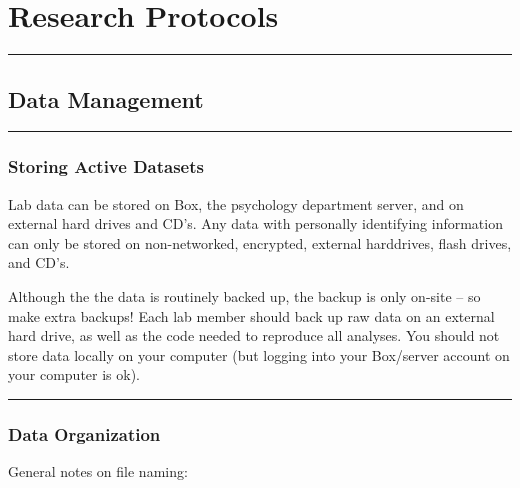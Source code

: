 \documentclass[
]{book}
\begin{document}
\hypertarget{research-protocols}{%
\chapter{Research Protocols}\label{research-protocols}}

\begin{center}\rule{0.5\linewidth}{0.5pt}\end{center}

\hypertarget{data-management}{%
\section{Data Management}\label{data-management}}

\begin{center}\rule{0.5\linewidth}{0.5pt}\end{center}

\hypertarget{storing-active-datasets}{%
\subsection{Storing Active Datasets}\label{storing-active-datasets}}

Lab data can be stored on Box, the psychology department server, and on external hard drives and CD's. Any data with personally identifying information can only be stored on non-networked, encrypted, external harddrives, flash drives, and CD's.

Although the the data is routinely backed up, the backup is only on-site -- so make extra backups! Each lab member should back up raw data on an external hard drive, as well as the code needed to reproduce all analyses. You should not store data locally on your computer (but logging into your Box/server account on your computer is ok).

\begin{center}\rule{0.5\linewidth}{0.5pt}\end{center}

\hypertarget{data-organization}{%
\subsection{Data Organization}\label{data-organization}}

General notes on file naming:
\end{document}
